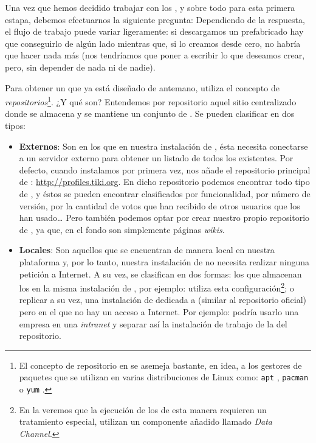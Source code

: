 Una vez que hemos decidido trabajar con los \profiles{}, y sobre todo para esta primera estapa, debemos efectuarnos la siguiente pregunta:  
Dependiendo de la respuesta, el flujo de trabajo puede variar ligeramente: si descargamos un \profile{} prefabricado hay que conseguirlo de algún lado mientras que, si lo creamos desde cero, no habría que hacer nada más (nos tendríamos que poner a escribir lo que deseamos crear, pero, sin depender de nada ni de nadie).

Para obtener un \profile{} que ya está diseñado de antemano, \tiki{} utiliza el concepto de \textit{repositorios}\footnote{El concepto de repositorio en \tiki{} se asemeja bastante, en idea, a los gestores de paquetes que se utilizan en varias distribuciones de Linux como: \texttt{apt} \cite{web:apt-debian}, \texttt{pacman} \cite{web:pacman-arch} o \texttt{yum} \cite{web:yum-fedora}.}. ¿Y qué son? Entendemos por repositorio aquel sitio centralizado donde se almacena y se mantiene un conjunto de \profiles{}. Se pueden clasificar en dos tipos:

\begin{itemize}
    \item \textbf{Externos}: Son en los que en nuestra instalación de \tiki{}, ésta necesita conectarse a un servidor externo para obtener un listado de todos los \profiles{} existentes. Por defecto, cuando instalamos \tiki{} por primera vez, nos añade el repositorio principal de \profiles{}: \url{http://profiles.tiki.org}. En dicho repositorio podemos encontrar todo tipo de \profiles{}, y éstos se pueden encontrar clasificados por funcionalidad, por número de versión, por la cantidad de votos que han recibido de otros usuarios que los han usado\ldots{} Pero también podemos optar por crear nuestro propio repositorio de \profiles{}, ya que, en el fondo son simplemente páginas \textit{wikis}.

    \item \textbf{Locales}: Son aquellos que se encuentran de manera local en nuestra plataforma y, por lo tanto, nuestra instalación de \tiki{} no necesita realizar ninguna petición a Internet. A su vez, se clasifican en dos formas: los que almacenan los \profiles{} en la misma instalación de \tiki{}, por ejemplo: \alma{} utiliza esta configuración\footnote{En la  veremos que la ejecución de los \profiles{} de esta manera requieren un tratamiento especial, utilizan un componente añadido llamado \textit{Data Channel}.}; o replicar a su vez, una instalación de \tiki{} dedicada a \profiles{} (similar al repositorio oficial) pero en el que no hay un acceso a Internet. Por ejemplo: podría usarlo una empresa en una \textit{intranet} y separar así la instalación de trabajo de la del repositorio.
\end{itemize}

